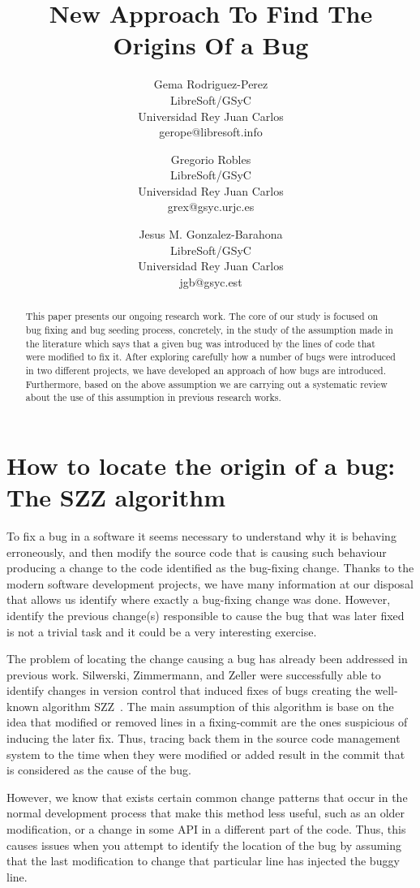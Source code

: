 \documentclass[a4paper]{article}
\title{New Approach To Find The Origins Of a Bug }
\author{
Gema Rodriguez-Perez \\ LibreSoft/GSyC\\
                Universidad Rey Juan Carlos \\ gerope@libresoft.info
\and
Gregorio Robles \\ LibreSoft/GSyC\\
                Universidad Rey Juan Carlos \\ grex@gsyc.urjc.es
\and
Jesus M. Gonzalez-Barahona \\LibreSoft/GSyC\\
                Universidad Rey Juan Carlos \\ jgb@gsyc.est
}
\begin{document}
\maketitle

\begin{abstract}

This paper presents our ongoing research work. The core of our study is focused on bug fixing and bug seeding process, concretely, in the study of the assumption made in the literature which says that a given bug was introduced by the lines of code that were modified to fix it. After exploring carefully how a number of bugs were introduced in two different projects, we have developed an approach of how bugs are introduced. Furthermore, based on the above assumption we are carrying out a systematic review about the use of this assumption in previous research works.

\end{abstract}


\section{How to locate the origin of a bug: The SZZ algorithm}

To fix a bug in a software it seems necessary to understand why it is behaving erroneously, and then modify the source code that is causing such behaviour producing a change to the code identified as the bug-fixing change. Thanks to the modern software development projects, we have many information at our disposal that allows us identify where exactly a bug-fixing change was done. However, identify the previous change(s) responsible to cause the bug that was later fixed is not a trivial task and it could be a very interesting exercise.

The problem of locating the change causing a bug has already been addressed in previous work. Silwerski, Zimmermann, and Zeller were successfully able to identify changes in version control that induced fixes of bugs creating the well-known algorithm SZZ~\cite{sliwerski2005changes}. The main assumption of this algorithm is base on the idea that modified or removed lines in a fixing-commit are the ones suspicious of inducing the later fix. Thus, tracing back them in the source code management system to the time when they were modified or added result in the commit that is considered as the cause of the bug.

However, we know that exists certain common change patterns that occur in the normal development process that make this method less useful, such as an older modification, or a change in some API in a different part of the code. Thus, this causes issues when you attempt to identify the location of the bug by assuming that the last modification to change that particular line has injected the buggy line.
\end{document}
